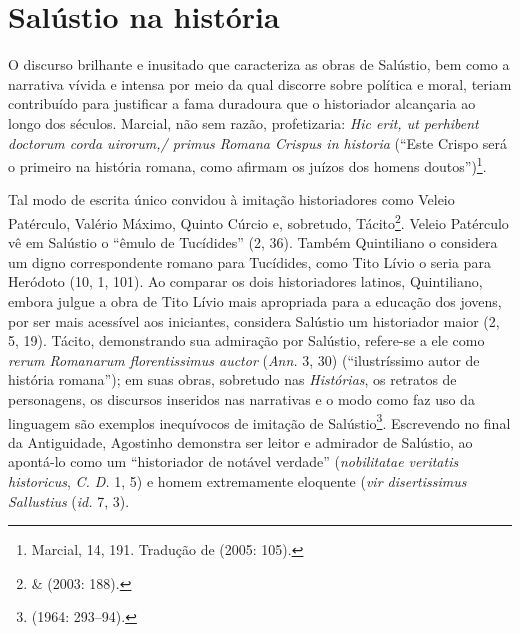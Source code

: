 \newcommand{\lat}{}%
\newcommand{\old}{\textsc{old}}
\newcommand{\lp}{\textsc{lp}}


\newcommand{\bra}{\selectlanguage{brazilian}{}} 
\newcommand{\ot}{\emph{Orator}\ }



\section{Salústio na história} 

O discurso brilhante e inusitado que caracteriza
as obras de Salústio, bem como a narrativa vívida e intensa por meio da qual
discorre sobre política e moral, teriam contribuído para justificar a fama
duradoura que o historiador alcançaria ao longo dos séculos. Marcial, não sem
razão, profetizaria: \emph{Hic erit, ut perhibent doctorum corda uirorum,/
primus Romana Crispus in historia}  (“Este Crispo será o primeiro na história
romana, como afirmam os juízos dos homens doutos”)\footnote{Marcial, 14, 191.
Tradução de  (2005: 105).}. 

Tal modo de escrita único convidou à imitação historiadores como Veleio
Patérculo, Valério Máximo, Quinto Cúrcio e, sobretudo,
Tácito\footnote{ \&   (2003: 188).}. Veleio
Patérculo vê em Salústio o “êmulo de Tucídides” (2, 36). Também Quintiliano o
considera um digno correspondente romano para Tucídides, como Tito Lívio o
seria para Heródoto (10, 1, 101).  Ao comparar os dois historiadores latinos,
Quintiliano, embora julgue a obra de Tito Lívio mais apropriada para a educação
dos jovens, por ser mais acessível aos iniciantes, considera Salústio um
historiador maior (2, 5, 19).  Tácito, demonstrando sua admiração por Salústio,
refere-se a ele como \lat \emph{rerum Romanarum florentissimus auctor} \bra
(\emph{Ann.} 3, 30) (“ilustríssimo autor de história romana”); em suas obras,
sobretudo nas \emph{Histórias},  os retratos de personagens, os discursos
inseridos nas narrativas e o modo como faz uso da linguagem são exemplos
inequívocos de imitação de Salústio\footnote{ (1964: 293--94).}.
Escrevendo no final da Antiguidade, Agostinho  demonstra ser leitor e admirador
de Salústio, ao apontá-lo como um  “historiador de notável verdade”
(\emph{nobilitatae veritatis historicus}, \emph{C. D.} 1, 5) e homem
extremamente eloquente (\emph{vir disertissimus Sallustius} (\emph{id.} 7, 3). 

